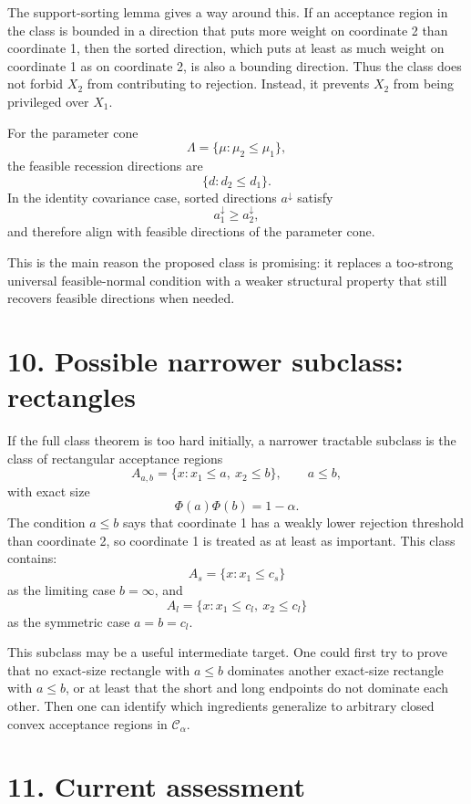 \documentclass[11pt]{article}
\begin{document}
The support-sorting lemma gives a way around this. If an acceptance region in the class is bounded in a direction that puts more weight on coordinate 2 than coordinate 1, then the sorted direction, which puts at least as much weight on coordinate 1 as on coordinate 2, is also a bounding direction. Thus the class does not forbid \(X_2\) from contributing to rejection. Instead, it prevents \(X_2\) from being privileged over \(X_1\).

For the parameter cone
\[
\Lambda=\{\mu:\mu_2\le\mu_1\},
\]
the feasible recession directions are
\[
\{d:d_2\le d_1\}.
\]
In the identity covariance case, sorted directions \(a^\downarrow\) satisfy
\[
a^\downarrow_1\ge a^\downarrow_2,
\]
and therefore align with feasible directions of the parameter cone.

This is the main reason the proposed class is promising: it replaces a too-strong universal feasible-normal condition with a weaker structural property that still recovers feasible directions when needed.

\section*{10. Possible narrower subclass: rectangles}

If the full class theorem is too hard initially, a narrower tractable subclass is the class of rectangular acceptance regions
\[
A_{a,b}=\{x:x_1\le a,
\ x_2\le b\},
\qquad
a\le b,
\]
with exact size
\[
\Phi(a)\Phi(b)=1-\alpha.
\]
The condition \(a\le b\) says that coordinate 1 has a weakly lower rejection threshold than coordinate 2, so coordinate 1 is treated as at least as important. This class contains:
\[
A_s=\{x:x_1\le c_s\}
\]
as the limiting case \(b=\infty\), and
\[
A_l=\{x:x_1\le c_l,
\ x_2\le c_l\}
\]
as the symmetric case \(a=b=c_l\).

This subclass may be a useful intermediate target. One could first try to prove that no exact-size rectangle with \(a\le b\) dominates another exact-size rectangle with \(a\le b\), or at least that the short and long endpoints do not dominate each other. Then one can identify which ingredients generalize to arbitrary closed convex acceptance regions in \(\mathcal C_\alpha\).

\section*{11. Current assessment}
\end{document}

